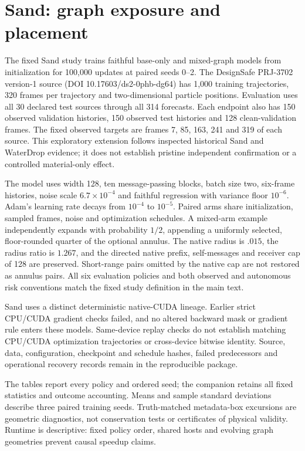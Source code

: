\section{Sand: graph exposure and placement}
\label{sec:sand-graph-exposure}
The fixed Sand study trains faithful base-only and mixed-graph models from initialization for 100,000 updates at paired seeds 0--2. The DesignSafe PRJ-3702 version-1 source (DOI 10.17603/ds2-0phb-dg64) has 1,000 training trajectories, 320 frames per trajectory and two-dimensional particle positions. Evaluation uses all 30 declared test sources through all 314 forecasts. Each endpoint also has 150 observed validation histories, 150 observed test histories and 128 clean-validation frames. The fixed observed targets are frames 7, 85, 163, 241 and 319 of each source. This exploratory extension follows inspected historical Sand and WaterDrop evidence; it does not establish pristine independent confirmation or a controlled material-only effect.

The model uses width 128, ten message-passing blocks, batch size two, six-frame histories, noise scale $6.7\times10^{-4}$ and faithful regression with variance floor $10^{-6}$. Adam's learning rate decays from $10^{-4}$ to $10^{-5}$. Paired arms share initialization, sampled frames, noise and optimization schedules. A mixed-arm example independently expands with probability $1/2$, appending a uniformly selected, floor-rounded quarter of the optional annulus. The native radius is $.015$, the radius ratio is $1.267$, and the directed native prefix, self-messages and receiver cap of 128 are preserved. Short-range pairs omitted by the native cap are not restored as annulus pairs. All six evaluation policies and both observed and autonomous risk conventions match the fixed study definition in the main text.

Sand uses a distinct deterministic native-CUDA lineage. Earlier strict CPU/CUDA gradient checks failed, and no altered backward mask or gradient rule enters these models. Same-device replay checks do not establish matching CPU/CUDA optimization trajectories or cross-device bitwise identity. Source, data, configuration, checkpoint and schedule hashes, failed predecessors and operational recovery records remain in the reproducible package.

The tables report every policy and ordered seed; the companion retains all fixed statistics and outcome accounting. Means and sample standard deviations describe three paired training seeds. Truth-matched metadata-box excursions are geometric diagnostics, not conservation tests or certificates of physical validity. Runtime is descriptive: fixed policy order, shared hosts and evolving graph geometries prevent causal speedup claims.

